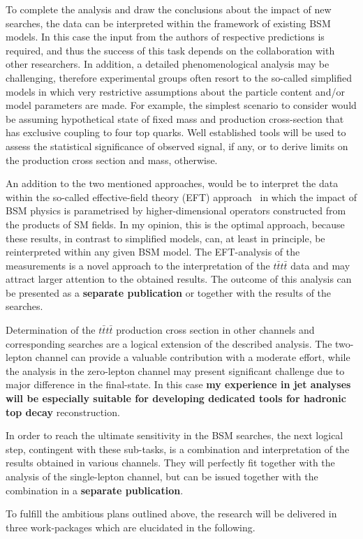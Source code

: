 To complete the analysis and draw the conclusions about the impact of new searches, the data can be interpreted within the framework of existing BSM models. In this case the input from the authors of respective predictions is required, and thus the success of this task depends on the collaboration with other researchers. In addition, a detailed phenomenological analysis may be challenging, therefore experimental groups often resort to the so-called simplified models in which very restrictive assumptions about the particle content and/or model parameters are made. For example, the simplest scenario to consider would be assuming hypothetical state of fixed mass and production cross-section that has exclusive coupling to four top quarks. Well established tools will be used to assess the statistical significance of observed signal, if any, or to derive limits on the production cross section and mass, otherwise.

An addition to the two mentioned approaches, would be to interpret the data within the so-called effective-field theory (EFT) approach~\cite{Lillie:2007hd} in which the impact of BSM physics is parametrised by higher-dimensional operators constructed from the products of SM fields. In my opinion, this is the optimal approach, because these results, in contrast to simplified models, can, at least in principle, be reinterpreted within any given BSM model. The EFT-analysis of the measurements is a novel approach to the interpretation of the $t\bar{t}t\bar{t}$ data and may attract larger attention to the obtained results. The outcome of this analysis can be presented as a \textbf{separate publication} or together with the results of the searches. 

Determination of the $t\bar{t}t\bar{t}$ production cross section in other channels and corresponding searches are a logical extension of the described analysis. The two-lepton channel can provide a valuable contribution with a moderate effort, while the analysis in the zero-lepton channel may present significant challenge due to major difference in the final-state. In this case \textbf{my experience in jet analyses will be especially suitable for developing dedicated tools for hadronic top decay} reconstruction.

In order to reach the ultimate sensitivity in the BSM searches, the next logical step, contingent with these sub-tasks, is a combination and interpretation of the results obtained in various channels. They will perfectly fit together with the analysis of the single-lepton channel, but can be issued together with the combination in a \textbf{separate publication}.

To fulfill the ambitious plans outlined above, the research will be delivered in three work-packages which are elucidated in the following.

